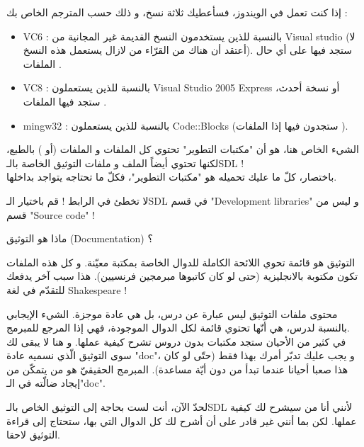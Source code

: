 إذا كنت تعمل في الويندوز، فسأعطيك ثلاثة نسخ، و ذلك حسب المترجم الخاص بك :

\begin{itemize}
	\item \textenglish{VC6} :
	بالنسبة للذين يستخدمون النسخ القديمة غير المجانية من
	\textenglish{Visual studio}
	(لا أعتقد أن هناك من القرّاء من لازال يستعمل هذه النسخ). ستجد فيها على أي حال الملفات
	.
	\item \textenglish{VC8} :
	 بالنسبة للذين يستعملون 
	\textenglish{Visual Studio 2005 Express}
	أو نسخة أحدث، ستجد فيها الملفات
	.
	\item \textenglish{mingw32} :
	بالنسبة للذين يستعملون 
	\textenglish{Code::Blocks}
	(ستجدون فيها إذا الملفات
	).
\end{itemize}

الشيء الخاص هنا، هو أن "مكتبات التطوير" تحتوي كل الملفات
و الملفات
(أو
)
بالطبع، لكنها تحتوي أيضاً الملف 
و ملفات التوثيق الخاصة بالـ\textenglish{SDL} !\\
باختصار، كلّ ما عليك تحميله هو "مكتبات التطوير"، فكلّ ما تحتاجه يتواجد بداخلها.

\begin{information}
لا تخطئ في الرابط ! قم باختيار الـ\textenglish{SDL}
في قسم
"\textenglish{Development libraries}"
و ليس من قسم
"\textenglish{Source code}" !
\end{information}

\begin{question}
ماذا هو التوثيق 
(\textenglish{Documentation}) ؟
\end{question}

التوثيق هو قائمة تحوي اللائحة الكاملة للدوال الخاصة بمكتبة معيّنة. و كل هذه الملفات تكون مكتوبة بالانجليزية (حتى لو كان كاتبوها مبرمجين فرنسيين). هذا سبب آخر يدفعك للتقدّم في لغة
\textenglish{Shakespeare} !

محتوى ملفات التوثيق  ليس عبارة عن درس، بل هي عادة موجزة. الشيء الإيجابي بالنسبة لدرس، هي أنّها تحتوي قائمة لكل الدوال الموجودة،  فهي إذا المرجع للمبرمج.\\
في كثير من الأحيان ستجد مكتبات بدون دروس تشرح كيفية عملها. و هنا لا يبقى لك سوى التوثيق الّذي نسميه عادة
"\textenglish{doc}"،
و يجب عليك تدبّر أمرك بهذا فقط (حتّى لو كان هذا صعبا أحيانا عندما تبدأ من دون أيّة مساعدة). المبرمج الحقيقيّ هو من يتمكّن من إيجاد ضالّته في الـ"\textenglish{doc}".

لحدّ الآن، أنت لست بحاجة إلى التوثيق الخاص بالـ\textenglish{SDL}
لأنني أنا من سيشرح لك كيفية عملها. لكن بما أنني غير قادر على أن أشرح لك كل الدوال التي بها، ستحتاج إلى قراءة التوثيق لاحقا. 

